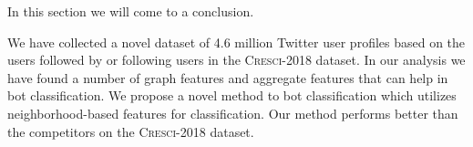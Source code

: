 In this section we will come to a conclusion.

\noindent We have collected a novel dataset of 4.6 million Twitter user profiles based on the users followed by or following users in the \textsc{Cresci-2018} dataset. In our analysis we have found a number of graph features and aggregate features that can help in bot classification. We propose a novel method to bot classification which utilizes neighborhood-based features for classification. Our method performs better than the competitors on the \textsc{Cresci-2018} dataset.